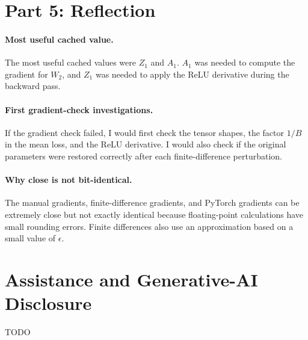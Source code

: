 \documentclass[11pt]{article}
\begin{document}
\section*{Part 5: Reflection}

\paragraph{Most useful cached value.} The most useful cached values were $Z_1$ and $A_1$.
$A_1$ was needed to compute the gradient for $W_2$, and $Z_1$ was needed
to apply the ReLU derivative during the backward pass.

\paragraph{First gradient-check investigations.} If the gradient check failed, I would first check the tensor shapes,
the factor $1/B$ in the mean loss, and the ReLU derivative.
I would also check if the original parameters were restored correctly
after each finite-difference perturbation.

\paragraph{Why close is not bit-identical.} The manual gradients, finite-difference gradients, and PyTorch gradients
can be extremely close but not exactly identical because floating-point
calculations have small rounding errors. Finite differences also use an
approximation based on a small value of $\epsilon$.

\section*{Assistance and Generative-AI Disclosure}

TODO
\end{document}
